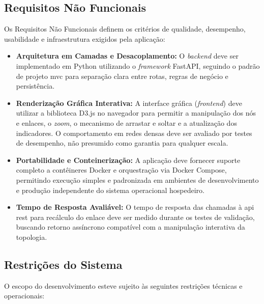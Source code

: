 \subsection{Requisitos Não Funcionais}

Os Requisitos Não Funcionais definem os critérios de qualidade, desempenho, usabilidade e infraestrutura exigidos pela aplicação:

\begin{itemize}
    \item \textbf{Arquitetura em Camadas e Desacoplamento:} O \textit{backend} deve ser implementado em Python utilizando o \textit{framework} FastAPI, seguindo o padrão de projeto \gls{mvc} para separação clara entre rotas, regras de negócio e persistência.
    
    \item \textbf{Renderização Gráfica Interativa:} A interface gráfica (\textit{frontend}) deve utilizar a biblioteca D3.js no navegador para permitir a manipulação dos nós e enlaces, o \textit{zoom}, o mecanismo de arrastar e soltar e a atualização dos indicadores. O comportamento em redes densas deve ser avaliado por testes de desempenho, não presumido como garantia para qualquer escala.
    
    \item \textbf{Portabilidade e Conteinerização:} A aplicação deve fornecer suporte completo a contêineres Docker e orquestração via Docker Compose, permitindo execução simples e padronizada em ambientes de desenvolvimento e produção independente do sistema operacional hospedeiro.
    
    \item \textbf{Tempo de Resposta Avaliável:} O tempo de resposta das chamadas à \gls{api} \gls{rest} para recálculo do enlace deve ser medido durante os testes de validação, buscando retorno assíncrono compatível com a manipulação interativa da topologia.
\end{itemize}

\subsection{Restrições do Sistema}

O escopo do desenvolvimento esteve sujeito às seguintes restrições técnicas e operacionais:

